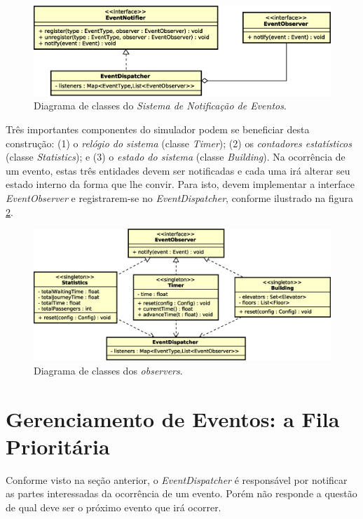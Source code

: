 \begin{figure}[htb!]
  \centering
  \includegraphics[scale=0.6]{img/Notification.eps}
  \caption{Diagrama de classes do \textit{Sistema de Notificação de Eventos}.}
\label{fig:diagram:notification}
\end{figure}

Três importantes componentes do simulador podem se beneficiar desta construção:
(1) o \textit{relógio do sistema} (classe \textit{Timer}); (2) os
\textit{contadores estatísticos} (classe \textit{Statistics}); e (3) o
\textit{estado do sistema} (classe \textit{Building}). Na ocorrência de um
evento, estas três entidades devem ser notificadas e cada uma irá alterar seu
estado interno da forma que lhe convir. Para isto, devem implementar a interface
\textit{EventObserver} e registrarem-se no \textit{EventDispatcher}, conforme
ilustrado na figura \ref{fig:diagram:observers}.

\begin{figure}[htb!]
  \centering
  \includegraphics[scale=0.6]{img/Observers.eps}
  \caption{Diagrama de classes dos \textit{observers}.}
\label{fig:diagram:observers}
\end{figure}

\section{Gerenciamento de Eventos: a Fila Prioritária}

Conforme visto na seção anterior, o \textit{EventDispatcher} é responsável por
notificar as partes interessadas da ocorrência de um evento. Porém não responde
a questão de qual deve ser o próximo evento que irá ocorrer.

